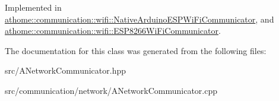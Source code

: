 Implemented in \mbox{\hyperlink{classathome_1_1communication_1_1wifi_1_1_native_arduino_e_s_p_wi_fi_communicator_a99fab41ad5275649efafa0a776a0348f}{athome\+::communication\+::wifi\+::\+Native\+Arduino\+E\+S\+P\+Wi\+Fi\+Communicator}}, and \mbox{\hyperlink{classathome_1_1communication_1_1wifi_1_1_e_s_p8266_wi_fi_communicator_afd3c1c4ce7d68717a7bb2cf1b9dc962f}{athome\+::communication\+::wifi\+::\+E\+S\+P8266\+Wi\+Fi\+Communicator}}.



The documentation for this class was generated from the following files\+:\begin{DoxyCompactItemize}
\item 
src/A\+Network\+Communicator.\+hpp\item 
src/communication/network/A\+Network\+Communicator.\+cpp\end{DoxyCompactItemize}
